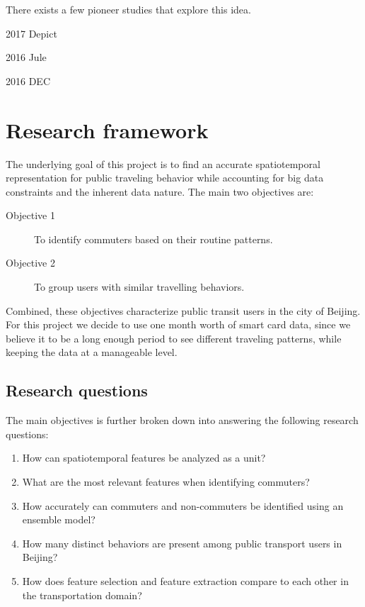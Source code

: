 \documentclass{article}
\begin{document}
There exists a few pioneer studies that explore this idea. %

2017 Depict \cite{dizaji2017deep}

2016 Jule \cite{yang2016joint}

2016 DEC \cite{xie2016unsupervised}


\newpage
\section{Research framework}
The underlying goal of this project is to find an accurate spatiotemporal representation for public traveling behavior while accounting for big data constraints and the inherent data nature. The main two objectives are:

\begin{description}
\item[Objective 1] To identify commuters based on their routine patterns. \label{eqn:obj1}
\item[Objective 2] To group users with similar travelling behaviors. \label{eqn:obj2}
\end{description}

Combined, these objectives characterize public transit users in the city of Beijing. For this project we decide to use one month worth of smart card data, since we believe it to be a long enough period to see different traveling patterns, while keeping the data at a manageable level. 

\subsection{Research questions}
The main objectives is further broken down into answering the following research questions: 

\begin{enumerate}

\item How can spatiotemporal features be analyzed as a unit?

\item What are the most relevant features when identifying commuters?

\item How accurately can commuters and non-commuters be identified using an ensemble model? 

\item How many distinct behaviors are present among public transport users in Beijing?

\item How does feature selection and feature extraction compare to each other in the transportation domain?

\end{enumerate}
\end{document}
